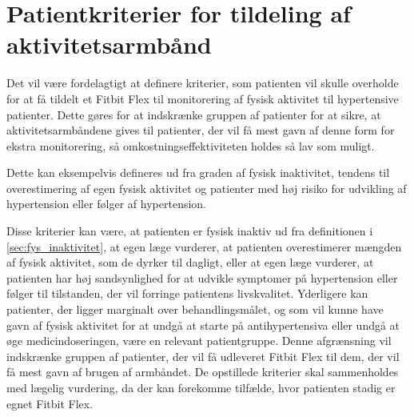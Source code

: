 \section{Patientkriterier for tildeling af aktivitetsarmbånd} \label{sec:kriterier}

Det vil være fordelagtigt at definere kriterier, som patienten vil skulle overholde for at få tildelt et Fitbit Flex til monitorering af fysisk aktivitet til hypertensive patienter. Dette gøres for at indskrænke gruppen af patienter for at sikre, at aktivitetsarmbåndene gives til patienter, der vil få mest gavn af denne form for ekstra monitorering, så omkostningseffektiviteten holdes så lav som muligt.

Dette kan eksempelvis defineres ud fra graden af fysisk inaktivitet, tendens til overestimering af egen fysisk aktivitet og patienter med høj risiko for udvikling af hypertension eller følger af hypertension. 

Disse kriterier kan være, at patienten er fysisk inaktiv ud fra definitionen i \autoref{sec:fys_inaktivitet}, at egen læge vurderer, at patienten overestimerer mængden af fysisk aktivitet, som de dyrker til dagligt, eller at egen læge vurderer, at patienten har høj sandsynlighed for at udvikle symptomer på hypertension eller følger til tilstanden, der vil forringe patientens livskvalitet. Yderligere kan patienter, der ligger marginalt over behandlingsmålet, og som vil kunne have gavn af fysisk aktivitet for at undgå at starte på antihypertensiva eller undgå at øge medicindoseringen, være en relevant patientgruppe. Denne afgrænsning vil indskrænke gruppen af patienter, der vil få udleveret Fitbit Flex til dem, der vil få mest gavn af brugen af armbåndet. 
De opstillede kriterier skal sammenholdes med lægelig vurdering, da der kan forekomme tilfælde, hvor patienten stadig er egnet Fitbit Flex. 

